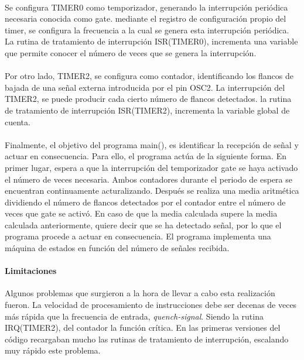 \paragraph{}
Se configura TIMER0 como temporizador, generando la interrupci\'on periódica necesaria conocida como gate. mediante el registro de configuración propio del timer, se configura la frecuencia a la cual se genera esta interrupción peri\'odica. La rutina de tratamiento de interrupción ISR(TIMER0), incrementa una variable que permite conocer el n\'umero de veces que se genera la interrupci\'on.
\paragraph{}
Por otro lado, TIMER2, se configura como contador, identificando los flancos de bajada de una señal externa introducida por el pin OSC2. La interrupción del TIMER2, se puede producir cada cierto número de flancos detectados. la rutina de tratamiento de interrupción ISR(TIMER2), incrementa la variable global de cuenta.

\paragraph{}
Finalmente, el objetivo del programa main(), es identificar la recepci\'on de señal y actuar en consecuencia.
Para ello, el programa actúa de la siguiente forma. 
En primer lugar, espera a que la interrupci\'on del temporizador gate se haya activado el número de veces necesaria. Ambos contadores durante el periodo de espera se encuentran continuamente acturalizando.
Después se realiza una media aritmética dividiendo el número de flancos detectados por el contador entre el número de veces que gate se activó.
En caso de que la media calculada supere la media calculada anteriormente, quiere decir que se ha detectado señal, por lo que el programa procede a actuar en consecuencia.
El programa implementa una máquina de estados en función del número de señales recibida.

\paragraph{Limitaciones}
Algunos problemas que surgieron a la hora de llevar a cabo esta realización fueron.
La velocidad de procesamiento de instrucciones debe ser decenas de veces más rápida que la frecuencia de entrada, \textit{quench-signal}. Siendo la rutina IRQ(TIMER2), del contador la función crítica.
En las primeras versiones del código recargaban mucho las rutinas de tratamiento de interrupción, escalando muy rápido este problema.
